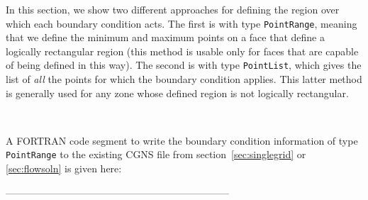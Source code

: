 \documentclass[12pt]{article}
\begin{document}
In this section, we show two different approaches for defining the
region over which each boundary condition acts.
The first is with type {\tt PointRange}, meaning that we define the
minimum and maximum points on a face that define a logically rectangular
region (this method is usable only for faces that are capable of being
defined in this way).
The second is with type {\tt PointList}, which gives the list of
{\it all} the points for which the boundary condition applies.
This latter method is generally used for any
zone whose defined region is not logically rectangular.

~

\noindent{}

A FORTRAN code segment to write the boundary condition
information of type {\tt PointRange}
to the existing CGNS file from section~\ref{sec:singlegrid}
or \ref{sec:flowsoln} is given here:

--------------------------------------------------------------------
\end{document}
